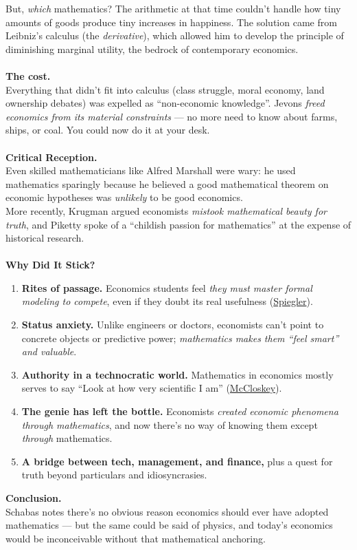 \documentclass[a4paper,12pt]{article}
\begin{document}
\noindent But, \emph{which} mathematics? The arithmetic at that time couldn't handle how tiny amounts of goods produce tiny increases in happiness. The solution came from Leibniz's calculus (the \emph{derivative}), which allowed him to develop the principle of diminishing marginal utility, the bedrock of contemporary economics. \\
\\
\noindent \textbf{The cost.} \\
\noindent Everything that didn't fit into calculus (class struggle, moral economy, land ownership debates) was expelled as ``non-economic knowledge''. Jevons \emph{freed economics from its material constraints} --- no more need to know about farms, ships, or coal. You could now do it at your desk. \\
\\
\noindent \textbf{Critical Reception.} \\
\noindent Even skilled mathematicians like Alfred Marshall were wary: he used mathematics sparingly because he believed a good mathematical theorem on economic hypotheses was \emph{unlikely} to be good economics. \\
\noindent More recently, Krugman argued economists \emph{mistook mathematical beauty for truth}, and Piketty spoke of a ``childish passion for mathematics'' at the expense of historical research. \\
\\
\noindent \textbf{Why Did It Stick?}
\begin{enumerate}
	\item \textbf{Rites of passage.} Economics students feel \emph{they must master formal modeling to compete}, even if they doubt its real usefulness (\underline{Spiegler}).
	\item \textbf{Status anxiety.} Unlike engineers or doctors, economists can't point to concrete objects or predictive power; \emph{mathematics makes them ``feel smart'' and valuable}.
	\item \textbf{Authority in a technocratic world.} Mathematics in economics mostly serves to say ``Look at how very scientific I am'' (\underline{McCloskey}).
	\item \textbf{The genie has left the bottle.} Economists \emph{created economic phenomena through mathematics}, and now there's no way of knowing them except \emph{through} mathematics.
	\item \textbf{A bridge between tech, management, and finance,} plus a quest for truth beyond particulars and idiosyncrasies.
\end{enumerate}
\noindent \textbf{Conclusion.} \\
\noindent Schabas notes there's no obvious reason economics should ever have adopted mathematics --- but the same could be said of physics, and today's economics would be inconceivable without that mathematical anchoring.
\end{document}

